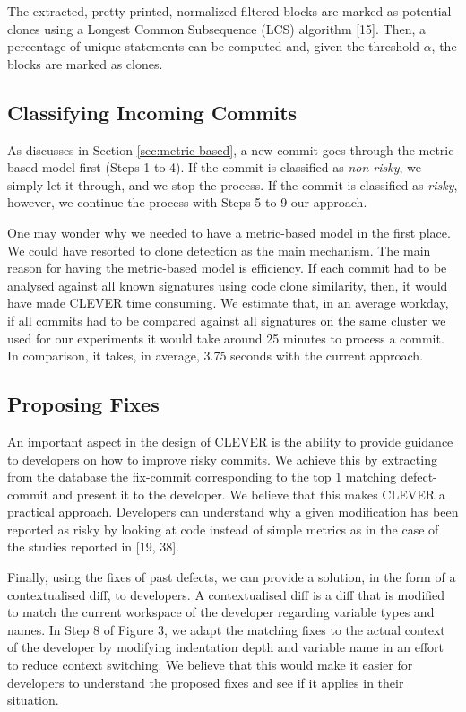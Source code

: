 \documentclass[sigconf]{acmart}
\begin{document}


The extracted, pretty-printed, normalized filtered blocks are marked as
potential clones using a Longest Common Subsequence (LCS) algorithm
[15]. Then, a percentage of unique statements can be computed and,
given the threshold \(\alpha\), the blocks are marked as clones.

\subsection{Classifying Incoming
Commits}\label{classifying-incoming-commits}

As discusses in Section \ref{sec:metric-based}, a new commit goes
through the metric-based model first (Steps 1 to 4). If the commit is
classified as \emph{non-risky}, we simply let it through, and we stop
the process. If the commit is classified as \emph{risky}, however, we
continue the process with Steps 5 to 9 our approach.

One may wonder why we needed to have a metric-based model in the first
place. We could have resorted to clone detection as the main mechanism.
The main reason for having the metric-based model is efficiency. If each
commit had to be analysed against all known signatures using code clone
similarity, then, it would have made CLEVER time consuming. We estimate
that, in an average workday, if all commits had to be compared against
all signatures on the same cluster we used for our experiments it would
take around 25 minutes to process a commit. In comparison, it takes, in
average, 3.75 seconds with the current approach.

\subsection{Proposing Fixes}\label{proposing-fixes}

An important aspect in the design of CLEVER is the ability to provide
guidance to developers on how to improve risky commits. We achieve this
by extracting from the database the fix-commit corresponding to the top
1 matching defect-commit and present it to the developer. We believe
that this makes CLEVER a practical approach. Developers can understand
why a given modification has been reported as risky by looking at code
instead of simple metrics as in the case of the studies reported in
[19, 38].

Finally, using the fixes of past defects, we can provide a solution, in
the form of a contextualised diff, to developers. A contextualised diff
is a diff that is modified to match the current workspace of the
developer regarding variable types and names. In Step 8 of Figure 3, we
adapt the matching fixes to the actual context of the developer by
modifying indentation depth and variable name in an effort to reduce
context switching. We believe that this would make it easier for
developers to understand the proposed fixes and see if it applies in
their situation.
\end{document}

